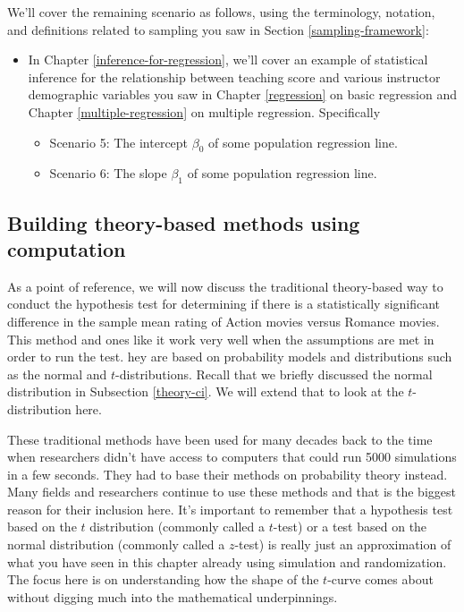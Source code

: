 \documentclass[12pt, krantz2,]{krantz}
\providecommand{\tightlist}{%
  \setlength{\itemsep}{0pt}\setlength{\parskip}{0pt}}
\begin{document}
We'll cover the remaining scenario as follows, using the terminology, notation, and definitions related to sampling you saw in Section \ref{sampling-framework}:

\begin{itemize}
\tightlist
\item
  In Chapter \ref{inference-for-regression}, we'll cover an example of statistical inference for the relationship between teaching score and various instructor demographic variables you saw in Chapter \ref{regression} on basic regression and Chapter \ref{multiple-regression} on multiple regression. Specifically

  \begin{itemize}
  \tightlist
  \item
    Scenario 5: The intercept \(\beta_0\) of some population regression line.
  \item
    Scenario 6: The slope \(\beta_1\) of some population regression line.
  \end{itemize}
\end{itemize}

\hypertarget{theory-hypo}{%
\subsection{Building theory-based methods using computation}\label{theory-hypo}}

As a point of reference, we will now discuss the traditional theory-based way to conduct the hypothesis test for determining if there is a statistically significant difference in the sample mean rating of Action movies versus Romance movies. This method and ones like it work very well when the assumptions are met in order to run the test. hey are based on probability models and distributions such as the normal and \(t\)-distributions. Recall that we briefly discussed the normal distribution in Subsection \ref{theory-ci}. We will extend that to look at the \(t\)-distribution here.

These traditional methods have been used for many decades back to the time when researchers didn't have access to computers that could run 5000 simulations in a few seconds. They had to base their methods on probability theory instead. Many fields and researchers continue to use these methods and that is the biggest reason for their inclusion here. It's important to remember that a hypothesis test based on the \(t\) distribution (commonly called a \(t\)-test) or a test based on the normal distribution (commonly called a \(z\)-test) is really just an approximation of what you have seen in this chapter already using simulation and randomization. The focus here is on understanding how the shape of the \(t\)-curve comes about without digging much into the mathematical underpinnings.
\end{document}
